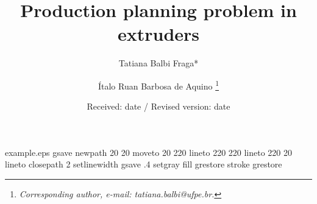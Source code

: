 %
%
%
%
\begin{filecontents*}{example.eps}
gsave
newpath
  20 20 moveto
  20 220 lineto
  220 220 lineto
  220 20 lineto
closepath
2 setlinewidth
gsave
  .4 setgray fill
grestore
stroke
grestore
\end{filecontents*}
%
\documentclass[global,referee]{svjour}
%
\usepackage{graphics}
%
%

%
\title{Production planning problem in extruders}
\author{Tatiana Balbi Fraga* \and Ítalo Ruan Barbosa de Aquino%
\thanks{\emph{Corresponding author, e-mail: tatiana.balbi@ufpe.br.}}%
}                     %
%
%
%
\date{Received: date / Revised version: date}
%
\maketitle
%
\begin{abstract}
Insert your abstract here.
\end{abstract}
%
\section{Introduction}
\label{intro}



